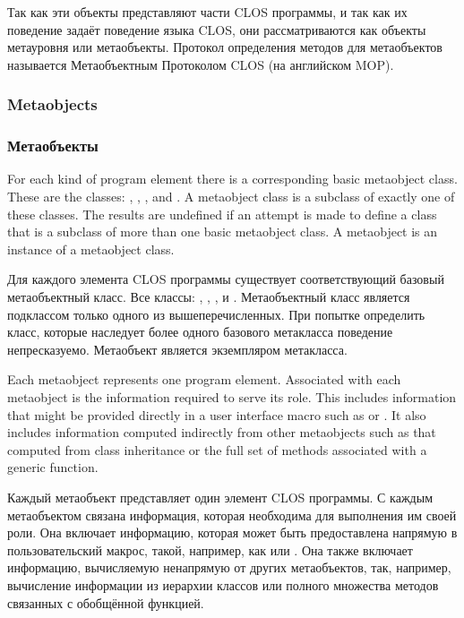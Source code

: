 Так как эти объекты представляют части CLOS программы, и так как их поведение
задаёт поведение языка CLOS, они рассматриваются как объекты метауровня или
метаобъекты. Протокол определения методов для метаобъектов называется
Метаобъектным Протоколом CLOS (на английском MOP).

\subsubsection{Metaobjects}

\subsubsection{Метаобъекты}

For each kind of program element there is a corresponding basic metaobject
class. These are the classes: , ,
,  
and . A metaobject class is a subclass of exactly one of these
classes. The results are undefined if an attempt is made to define a class that
is a subclass of more than one basic metaobject class. A metaobject is an
instance of a metaobject class. 

Для каждого элемента CLOS программы существует соответствующий базовый
метаобъектный класс. Все классы: , ,
,  
и . Метаобъектный класс является подклассом только
одного из вышеперечисленных. При попытке определить класс, которые наследует
более одного базового метакласса поведение непресказуемо. Метаобъект является
экземпляром метакласса.

Each metaobject represents one program element. Associated with each metaobject
is the information required to serve its role. This includes information that
might be provided directly in a user interface macro such as  or
. It also includes information computed indirectly from other
metaobjects such as that computed from class inheritance or the full set of
methods associated with a generic function. 

Каждый метаобъект представляет один элемент CLOS программы. С каждым
метаобъектом связана информация, которая необходима для выполнения им своей
роли. Она включает информацию, которая может быть предоставлена напрямую в
пользовательский макрос, такой, например, как  или
. Она также включает информацию, вычисляемую ненапрямую от других
метаобъектов, так, например, вычисление информации из иерархии классов или
полного множества методов связанных с обобщённой функцией.

